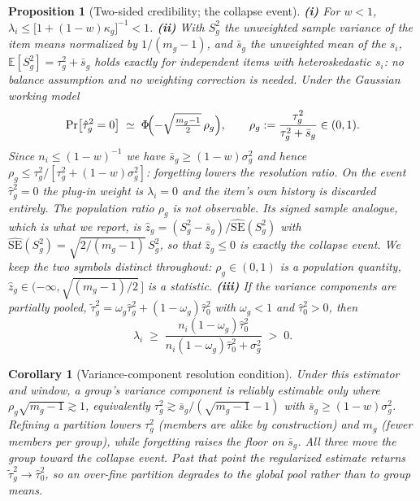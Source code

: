 \documentclass[twocolumn,10pt]{article}
\newtheorem{proposition}{Proposition}
\newtheorem{corollary}{Corollary}
\begin{document}
\begin{proposition}[Two-sided credibility; the collapse event]
\label{prop:twosided}
\textbf{(i)} For $w<1$,
$\lambda_i\le\bigl[1+(1-w)\kappa_g\bigr]^{-1}<1$.
\textbf{(ii)} With $S_g^2$ the unweighted sample variance of the item
means normalized by $1/(m_g-1)$, and $\bar s_g$ the unweighted mean of the
$s_i$, $\mathbb{E}[S_g^2]=\tau_g^2+\bar s_g$ holds \emph{exactly} for
independent items with heteroskedastic $s_i$: no balance assumption and
no weighting correction is needed. Under the Gaussian working model
\[
\Pr\bigl[\hat\tau_g^2=0\bigr]\;\simeq\;
\Phi\!\Bigl(-\sqrt{\tfrac{m_g-1}{2}}\,\rho_g\Bigr),
\qquad
\rho_g:=\frac{\tau_g^2}{\tau_g^2+\bar s_g}\in(0,1).
\]
Since $n_i\le(1-w)^{-1}$ we have $\bar s_g\ge(1-w)\sigma_g^2$ and hence
$\rho_g\le\tau_g^2/[\tau_g^2+(1-w)\sigma_g^2]$: \emph{forgetting lowers
the resolution ratio}. On the event $\hat\tau_g^2=0$ the plug-in weight is
$\lambda_i=0$ and the item's own history is discarded entirely.
The population ratio $\rho_g$ is not observable. Its signed sample
analogue, which is what we report, is
$\hat z_g=(S_g^2-\bar s_g)/\widehat{\mathrm{SE}}(S_g^2)$ with
$\widehat{\mathrm{SE}}(S_g^2)=\sqrt{2/(m_g-1)}\,S_g^2$, so that
$\hat z_g\le0$ is exactly the collapse event. We keep the two symbols
distinct throughout: $\rho_g\in(0,1)$ is a population quantity,
$\hat z_g\in(-\infty,\sqrt{(m_g-1)/2}\,]$ is a statistic.
\textbf{(iii)} If the variance components are partially pooled,
$\tilde\tau_g^2=\omega_g\hat\tau_g^2+(1-\omega_g)\hat\tau_0^2$ with
$\omega_g<1$ and $\hat\tau_0^2>0$, then
\[
\lambda_i\;\ge\;
\frac{n_i(1-\omega_g)\hat\tau_0^2}
     {n_i(1-\omega_g)\hat\tau_0^2+\sigma_g^2}\;>\;0 .
\]
\end{proposition}

\begin{corollary}[Variance-component resolution condition]
\label{cor:resolution}
Under this estimator and window, a group's variance component is
reliably estimable only where $\rho_g\sqrt{m_g-1}\gtrsim1$, equivalently
$\tau_g^2\gtrsim\bar s_g/(\sqrt{m_g-1}-1)$ with
$\bar s_g\ge(1-w)\sigma_g^2$. Refining a partition lowers $\tau_g^2$
(members are alike by construction) and $m_g$ (fewer members per group),
while forgetting raises the floor on $\bar s_g$. All three move the group
toward the collapse event. Past that point the regularized estimate
returns $\tilde\tau_g^2\to\hat\tau_0^2$, so an over-fine partition
degrades to the \emph{global pool} rather than to group means.
\end{corollary}
\end{document}
